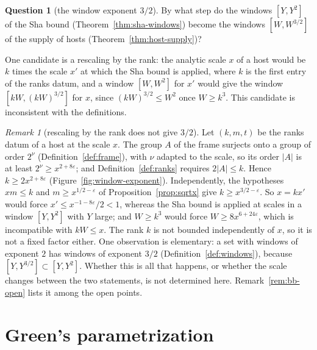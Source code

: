 \documentclass[11pt]{amsbook}
\theoremstyle{plain}
\theoremstyle{definition}
\newtheorem{question}[theorem]{Question}
\theoremstyle{remark}
\newtheorem{remark}[theorem]{Remark}
\numberwithin{equation}{section}
\numberwithin{figure}{chapter}
\numberwithin{table}{chapter}
\newcommand{\eps}{\varepsilon}
\begin{document}
\begin{question}[the window exponent $3/2$]\label{q:window-exponent}
By what step do the windows $[Y,Y^2]$ of the Sha bound
(Theorem~\ref{thm:sha-windows}) become the windows $[W,W^{3/2}]$ of
the supply of hosts (Theorem~\ref{thm:host-supply})?
\end{question}

\noindent One candidate is a rescaling by the rank: the
analytic scale $x$ of a host would be $k$ times the scale $x'$ at
which the Sha bound is applied, where $k$ is the first entry of the
ranks datum, and a window $[W,W^2]$ for $x'$ would give the window
$[kW,(kW)^{3/2}]$ for $x$, since $(kW)^{3/2}\le W^2$ once
$W\ge k^3$. This candidate is inconsistent with the definitions.
\begin{figure}[tbp]
\centering

\end{figure}

\begin{remark}[rescaling by the rank does not give $3/2$]
\label{rem:window-exponent}
Let $(k,m,t)$ be the ranks datum of a host at the scale $x$. The
group $A$ of the frame surjects onto a group of order $2^\nu$
(Definition~\ref{def:frame}), with $\nu$ adapted to the scale, so
its order $|A|$ is at least $2^\nu\ge x^{2+8\eps}$; and
Definition~\ref{def:ranks} requires $2|A|\le k$.
Hence $k\ge2x^{2+8\eps}$ (Figure~\ref{fig:window-exponent}). Independently, the hypotheses
$xm\le k$ and $m\ge x^{1/2-\eps}$ of Proposition~\ref{prop:sqrtx}
give $k\ge x^{3/2-\eps}$. So $x=kx'$ would force
$x'\le x^{-1-8\eps}/2<1$, whereas the Sha bound is applied at
scales in a window $[Y,Y^2]$ with $Y$ large; and $W\ge k^3$ would
force $W\ge8x^{6+24\eps}$, which is incompatible with $kW\le x$.
The rank $k$ is not bounded independently of $x$, so it is not a
fixed factor either. One observation is elementary: a set with
windows of exponent $2$ has windows of exponent $3/2$
(Definition~\ref{def:windows}), because
$[Y,Y^{3/2}]\subset[Y,Y^2]$. Whether this is all that happens, or
whether the scale changes between the two statements, is not
determined here. Remark~\ref{rem:bb-open} lists it among the open
points.
\end{remark}

\section{Green's parametrization}
\end{document}
